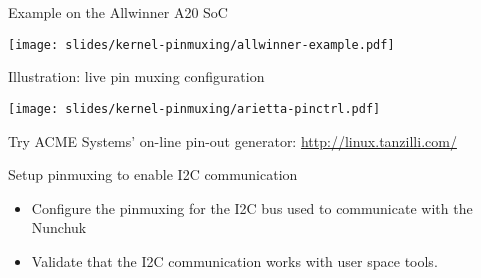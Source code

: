 \begin{frame}[fragile]{Example on the Allwinner A20 SoC}
  \begin{center}
    \texttt{[image: slides/kernel-pinmuxing/allwinner-example.pdf]}
  \end{center}
\end{frame}

\begin{frame}[fragile]{Illustration: live pin muxing configuration}
  \begin{center}
    \texttt{[image: slides/kernel-pinmuxing/arietta-pinctrl.pdf]}
  \end{center}
  Try ACME Systems' on-line pin-out generator: \url{http://linux.tanzilli.com/}
\end{frame}

\setuplabframe
{Setup pinmuxing to enable I2C communication}
{
  \begin{itemize}
  \item Configure the pinmuxing for the I2C bus used to communicate
    with the Nunchuk
  \item Validate that the I2C communication works with user space
    tools.
  \end{itemize}
}
